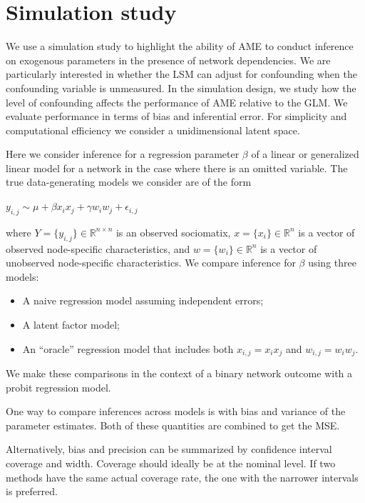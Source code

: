 \section{Simulation study}

We use a simulation study to highlight the ability of AME to conduct inference on exogenous parameters in the presence of network dependencies. We are particularly interested in whether the LSM can adjust for confounding when the confounding variable is unmeasured. In the simulation design, we study how the level of confounding affects the performance of AME relative to the GLM. We evaluate performance in terms of bias and inferential error. For simplicity and computational efficiency we consider a unidimensional latent space. 

Here we consider inference for a regression parameter $\beta$ of a linear or generalized linear model for a network in the case where there is an omitted variable. The true data-generating models we consider are of the form 

$y_{i,j} \sim  \mu + \beta x_i x_j + \gamma w_i w_j + \epsilon_{i,j} $

where $Y= \{y_{i,j}\}\in \mathbb R^{n\times n}$ is an observed sociomatix, $x = \{x_i \} \in \mathbb R^n$ is a vector of observed node-specific characteristics, and $w = \{ w_i\} \in \mathbb R^n$ is a vector of unobserved node-specific characteristics. We compare inference for $\beta$ using three models:

\begin{itemize}
	\item A naive regression model assuming independent errors; 
	\item A latent factor model; 
	\item An ``oracle'' regression model that includes both $x_{i,j}=x_i x_j$ and $w_{i,j}=w_i w_j$. 
\end{itemize}

We make these comparisons in the context of a binary network outcome with a probit regression model. 

One way to compare inferences across models is  with bias and variance of the parameter estimates. Both of these quantities are combined to get the MSE. 

Alternatively, bias and precision can be summarized by confidence interval coverage and width. Coverage should ideally be at the nominal level. If two methods have the same actual coverage rate, the one with the narrower intervals is preferred. 

